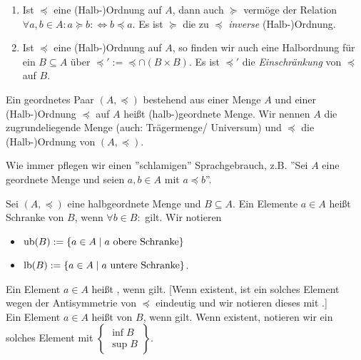 \documentclass[../../main.tex]{subfiles}
\begin{document}
\begin{bem}\label{12.1.3}
\begin{enumerate}[\normalfont(a)]
\item Ist $\preceq$ eine (Halb-)Ordnung auf $A$, dann auch $\succeq$ vermöge der Relation $\forall a,b\in A: a\succeq b:\Longleftrightarrow b\preceq a$. Es ist $\succeq$ die zu $\preceq$ \emph{inverse}	 (Halb-)Ordnung.
\item Ist $\preceq$ eine (Halb-)Ordnung auf $A$, so finden wir auch eine Halbordnung für ein $B\subseteq A$ über $\preceq':=\preceq\cap (B\times B)$. Es ist $\preceq'$ die \emph{Einschränkung} von $\preceq$ auf $B$.
\end{enumerate}
\end{bem}

\begin{df}\label{12.1.4}
 Ein geordnetes Paar $(A,\preceq)$ bestehend aus einer Menge $A$ und einer (Halb-)Ordnung $\preceq$ auf $A$ heißt (halb-)geordnete Menge. Wir nennen $A$ die zugrundeliegende Menge (auch: Trägermenge/ Universum) und $\preceq$ die (Halb-)Ordnung von $(A,\preceq)$.
\end{df}

\begin{bem}\label{12.1.5} Wie immer pflegen wir einen ''schlamigen'' Sprachgebrauch, z.B. ''Sei $A$ eine geordnete Menge und seien $a,b\in A$ mit $a\preceq b$''.
\end{bem}

\begin{df}\label{12.1.6}
Sei $(A,\preceq)$ eine halbgeordnete Menge und $B\subseteq A$. Ein Elemente $a\in A$ heißt  Schranke von $B$, wenn $\forall b\in B:$  gilt. Wir notieren
\begin{itemize}
	\item $\operatorname{ub}(B):=\{a\in A\mid a\text{ obere Schranke}\}$
	\item $\operatorname{lb}(B):=\{a\in A\mid a\text{ untere Schranke}\}$.
\end{itemize}

\noindent Ein Element $a\in A$ heißt , wenn  gilt.  [Wenn existent, ist ein solches Element wegen der Antisymmetrie von $\preceq$ eindeutig und wir notieren dieses mit .]\\
			
\noindent Ein Element $a\in A$ heißt  von $B$, wenn  gilt. Wenn existent, notieren wir ein solches Element mit $\left\{\begin{matrix*}\inf B \\ \sup B\end{matrix*}\right\}$.
\end{df}
\end{document}
